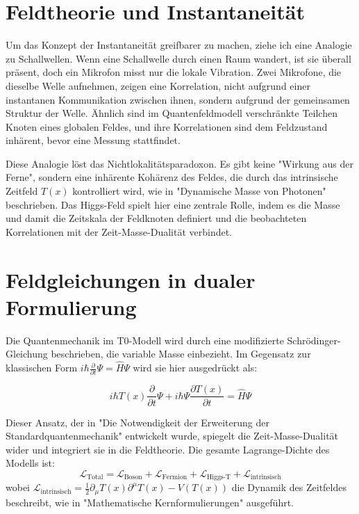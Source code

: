 \documentclass[a4paper,12pt]{article}
\newcommand{\Tfield}{T(x)}
\theoremstyle{definition}
\theoremstyle{remark}
\begin{document}
	\section{Feldtheorie und Instantaneität}
	
	Um das Konzept der Instantaneität greifbarer zu machen, ziehe ich eine Analogie zu Schallwellen. Wenn eine Schallwelle durch einen Raum wandert, ist sie überall präsent, doch ein Mikrofon misst nur die lokale Vibration. Zwei Mikrofone, die dieselbe Welle aufnehmen, zeigen eine Korrelation, nicht aufgrund einer instantanen Kommunikation zwischen ihnen, sondern aufgrund der gemeinsamen Struktur der Welle. Ähnlich sind im Quantenfeldmodell verschränkte Teilchen Knoten eines globalen Feldes, und ihre Korrelationen sind dem Feldzustand inhärent, bevor eine Messung stattfindet.
	
	Diese Analogie löst das Nichtlokalitätsparadoxon. Es gibt keine "Wirkung aus der Ferne", sondern eine inhärente Kohärenz des Feldes, die durch das intrinsische Zeitfeld \(\Tfield\) kontrolliert wird, wie in "Dynamische Masse von Photonen" \cite{pascher_photons_2025} beschrieben. Das Higgs-Feld spielt hier eine zentrale Rolle, indem es die Masse und damit die Zeitskala der Feldknoten definiert und die beobachteten Korrelationen mit der Zeit-Masse-Dualität verbindet.
	
	\section{Feldgleichungen in dualer Formulierung}
	
	Die Quantenmechanik im T0-Modell wird durch eine modifizierte Schrödinger-Gleichung beschrieben, die variable Masse einbezieht. Im Gegensatz zur klassischen Form \(i\hbar \frac{\partial}{\partial t} \Psi = \hat{H} \Psi\) wird sie hier ausgedrückt als:
	
	\begin{equation}
		i\hbar \Tfield \frac{\partial}{\partial t} \Psi + i\hbar \Psi \frac{\partial \Tfield}{\partial t} = \hat{H} \Psi
	\end{equation}
	
	Dieser Ansatz, der in "Die Notwendigkeit der Erweiterung der Standardquantenmechanik" \cite{pascher_quantum_2025} entwickelt wurde, spiegelt die Zeit-Masse-Dualität wider und integriert sie in die Feldtheorie. Die gesamte Lagrange-Dichte des Modells ist:
	\begin{equation}
		\mathcal{L}_{\text{Total}} = \mathcal{L}_{\text{Boson}} + \mathcal{L}_{\text{Fermion}} + \mathcal{L}_{\text{Higgs-T}} + \mathcal{L}_{\text{intrinsisch}}
	\end{equation}
	wobei \(\mathcal{L}_{\text{intrinsisch}} = \frac{1}{2} \partial_\mu \Tfield \partial^\mu \Tfield - V(\Tfield)\) die Dynamik des Zeitfeldes beschreibt, wie in "Mathematische Kernformulierungen" \cite{pascher_lagrange_2025} ausgeführt.
	
\end{document}
